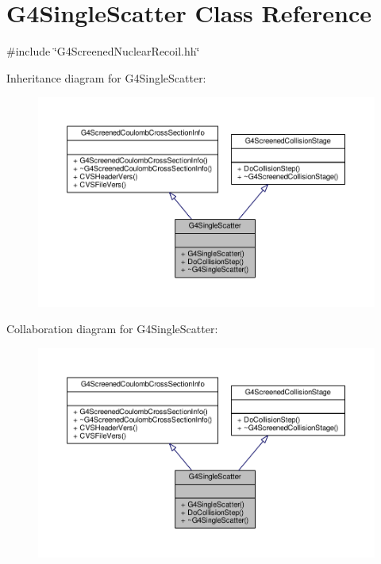 \hypertarget{classG4SingleScatter}{}\section{G4\+Single\+Scatter Class Reference}
\label{classG4SingleScatter}


{\ttfamily \#include \char`\"{}G4\+Screened\+Nuclear\+Recoil.\+hh\char`\"{}}



Inheritance diagram for G4\+Single\+Scatter\+:
\nopagebreak
\begin{figure}[H]
\begin{center}
\leavevmode
\includegraphics[width=350pt]{classG4SingleScatter__inherit__graph}
\end{center}
\end{figure}


Collaboration diagram for G4\+Single\+Scatter\+:
\nopagebreak
\begin{figure}[H]
\begin{center}
\leavevmode
\includegraphics[width=350pt]{classG4SingleScatter__coll__graph}
\end{center}
\end{figure}

